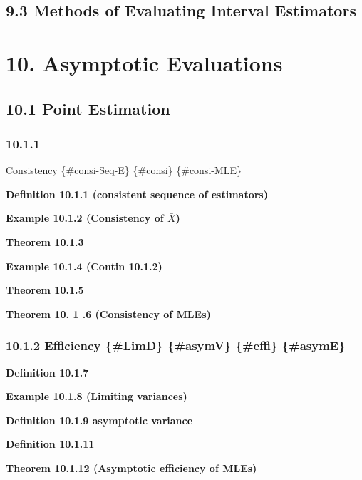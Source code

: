 \documentclass[10pt,twocolumn,portrait]{article}
\begin{document}
\hypertarget{methods-of-evaluating-interval-estimators}{%
\subsection{9.3 Methods of Evaluating Interval
Estimators}\label{methods-of-evaluating-interval-estimators}}

\hypertarget{asymptotic-evaluations}{%
\section{10. Asymptotic Evaluations}\label{asymptotic-evaluations}}

\hypertarget{point-estimation-1}{%
\subsection{10.1 Point Estimation}\label{point-estimation-1}}

\hypertarget{section-8}{%
\subsubsection{10.1.1}\label{section-8}}

Consistency \{\#consi-Seq-E\} \{\#consi\} \{\#consi-MLE\}

\textbf{Definition 10.1.1 (consistent sequence of estimators)}

\textbf{Example 10.1.2 (Consistency of \(\bar X\))}

\textbf{Theorem 10.1.3}

\textbf{Example 10.1.4 (Contin 10.1.2)}

\textbf{Theorem 10.1.5}

\textbf{Theorem 10. 1 .6 (Consistency of MLEs)}

\hypertarget{asymD}{%
\subsubsection{10.1.2 Efficiency \{\#LimD\} \{\#asymV\} \{\#effi\}
\{\#asymE\}}\label{asymD}}

\textbf{Definition 10.1.7}

\textbf{Example 10.1.8 (Limiting variances)}

\textbf{Definition 10.1.9 asymptotic variance}

\textbf{Definition 10.1.11}

\textbf{Theorem 10.1.12 (Asymptotic efficiency of MLEs)}
\end{document}
